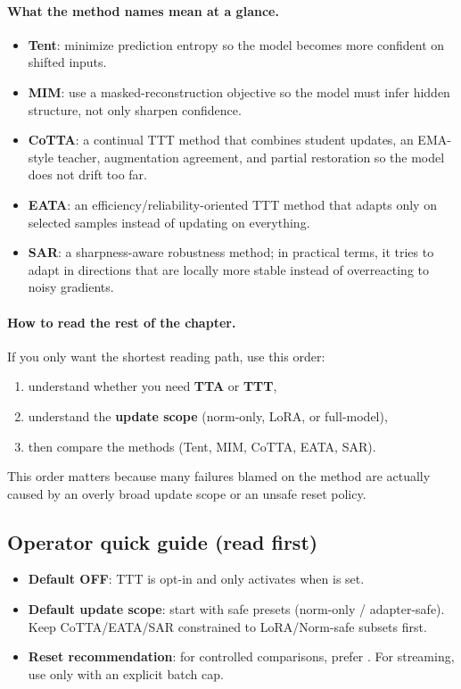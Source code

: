 \paragraph{What the method names mean at a glance.}
\begin{itemize}
  \item \textbf{Tent}: minimize prediction entropy so the model becomes more confident on shifted inputs.
  \item \textbf{MIM}: use a masked-reconstruction objective so the model must infer hidden structure, not only sharpen confidence.
  \item \textbf{CoTTA}: a continual TTT method that combines student updates, an EMA-style teacher, augmentation agreement, and partial restoration so the model does not drift too far.
  \item \textbf{EATA}: an efficiency/reliability-oriented TTT method that adapts only on selected samples instead of updating on everything.
  \item \textbf{SAR}: a sharpness-aware robustness method; in practical terms, it tries to adapt in directions that are locally more stable instead of overreacting to noisy gradients.
\end{itemize}

\paragraph{How to read the rest of the chapter.}
If you only want the shortest reading path, use this order:
\begin{enumerate}
  \item understand whether you need \textbf{TTA} or \textbf{TTT},
  \item understand the \textbf{update scope} (norm-only, LoRA, or full-model),
  \item then compare the methods (Tent, MIM, CoTTA, EATA, SAR).
\end{enumerate}
This order matters because many failures blamed on the method are actually
caused by an overly broad update scope or an unsafe reset policy.

\subsection{Operator quick guide (read first)}
\begin{itemize}
  \item \textbf{Default OFF}: TTT is opt-in and only activates when  is set.
  \item \textbf{Default update scope}: start with safe presets (norm-only / adapter-safe). Keep CoTTA/EATA/SAR constrained to LoRA/Norm-safe subsets first.
  \item \textbf{Reset recommendation}: for controlled comparisons, prefer . For streaming, use  only with an explicit batch cap.
\end{itemize}

